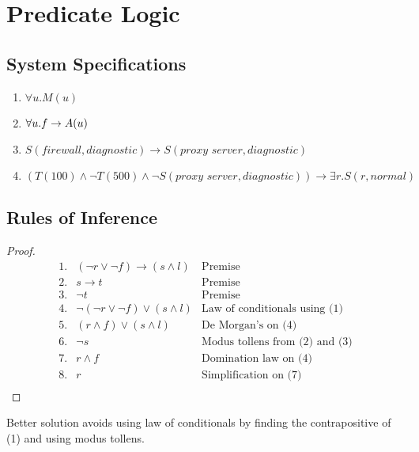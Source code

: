 \chapter{Predicate Logic}
\section{System Specifications}
\begin{enumerate}
    \item \(\forall u. M(u)\)
    \item \(\forall u. \space  f \rightarrow A(u)\)
    \item \(S(firewall, diagnostic) \rightarrow S(\textit{proxy server}, diagnostic)\)
    \item \((T(100) \land \neg T(500) \land \neg S(\textit{proxy server}, diagnostic)) \rightarrow \exists r. S(r, normal)\)
\end{enumerate}

\section{Rules of Inference}
\begin{proof}
    \begin{equation*}
        \begin{array}{rll}
            \text{1.} & (\neg r \lor \neg f) \rightarrow (s \land l) & \text{Premise}                        \\
            \text{2.} & s \rightarrow t                              & \text{Premise}                        \\
            \text{3.} & \neg t                                       & \text{Premise}                        \\
            \text{4.} & \neg(\neg r \lor \neg f) \lor (s \land l)    & \text{Law of conditionals using (1)}  \\
            \text{5.} & (r \land f) \lor (s \land l)                 & \text{De Morgan's on (4)}             \\
            \text{6.} & \neg s                                       & \text{Modus tollens from (2) and (3)} \\
            \text{7.} & r \land f                                    & \text{Domination law on (4)}          \\
            \text{8.} & r                                            & \text{Simplification on (7)}          \\
        \end{array}
    \end{equation*}
\end{proof}
Better solution avoids using law of conditionals by finding the contrapositive of (1) and using modus tollens.

